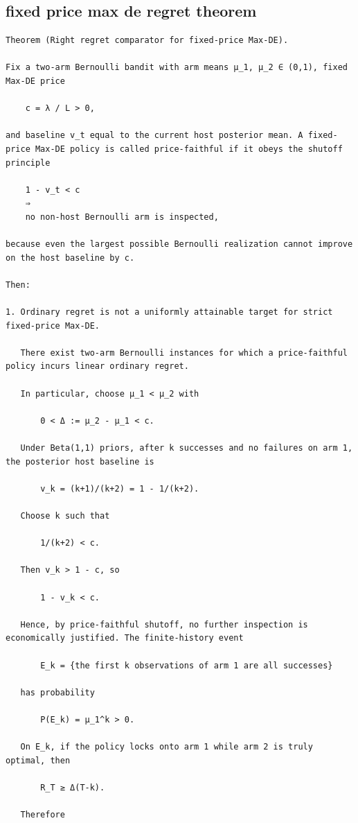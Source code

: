 \subsection{fixed price max de regret theorem}
\begin{small}
\begin{verbatim}
Theorem (Right regret comparator for fixed-price Max-DE).

Fix a two-arm Bernoulli bandit with arm means μ_1, μ_2 ∈ (0,1), fixed Max-DE price

    c = λ / L > 0,

and baseline v_t equal to the current host posterior mean. A fixed-price Max-DE policy is called price-faithful if it obeys the shutoff principle

    1 - v_t < c
    ⇒
    no non-host Bernoulli arm is inspected,

because even the largest possible Bernoulli realization cannot improve on the host baseline by c.

Then:

1. Ordinary regret is not a uniformly attainable target for strict fixed-price Max-DE.

   There exist two-arm Bernoulli instances for which a price-faithful policy incurs linear ordinary regret.

   In particular, choose μ_1 < μ_2 with

       0 < Δ := μ_2 - μ_1 < c.

   Under Beta(1,1) priors, after k successes and no failures on arm 1, the posterior host baseline is

       v_k = (k+1)/(k+2) = 1 - 1/(k+2).

   Choose k such that

       1/(k+2) < c.

   Then v_k > 1 - c, so

       1 - v_k < c.

   Hence, by price-faithful shutoff, no further inspection is economically justified. The finite-history event

       E_k = {the first k observations of arm 1 are all successes}

   has probability

       P(E_k) = μ_1^k > 0.

   On E_k, if the policy locks onto arm 1 while arm 2 is truly optimal, then

       R_T ≥ Δ(T-k).

   Therefore


\end{verbatim}
\end{small}
